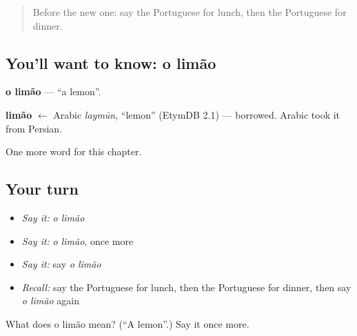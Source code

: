 \begin{quote}
Before the new one: say the Portuguese for lunch, then the Portuguese for dinner.
\end{quote}

\subsection*{You'll want to know: o limão}
\textbf{o limão} — \textquotedblleft{}a lemon\textquotedblright{}.

\begin{cousinweb}
\textbf{limão} $\leftarrow$ Arabic \emph{laymūn}, \textquotedblleft{}lemon\textquotedblright{} (EtymDB 2.1) — borrowed. Arabic took it from Persian.
\end{cousinweb}

\begin{grammarlens}[title={What you've built}]
One more word for this chapter.
\end{grammarlens}

\subsection*{Your turn}
\begin{itemize}
\raggedright
  \item \emph{Say it:} \emph{o limão}
  \item \emph{Say it:} \emph{o limão}, once more
  \item \emph{Say it:} say \emph{o limão}
  \item \emph{Recall:} say the Portuguese for lunch, then the Portuguese for dinner, then say \emph{o limão} again
\end{itemize}

\begin{tcolorbox}[breakable,colback=teal!4,colframe=teal!35!black,title={Before you move on}]
What does o limão mean? (\textquotedblleft{}A lemon\textquotedblright{}.) Say it once more.
\end{tcolorbox}
